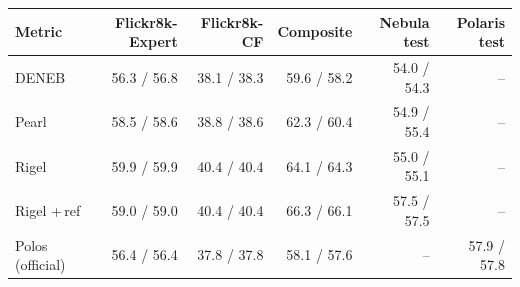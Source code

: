 \begin{tabular}{lrrrrr}
\toprule
Metric & Flickr8k-Expert & Flickr8k-CF & Composite & Nebula test & Polaris test \\
\midrule
DENEB & 56.3 / 56.8 & 38.1 / 38.3 & 59.6 / 58.2 & 54.0 / 54.3 & -- \\
Pearl & 58.5 / 58.6 & 38.8 / 38.6 & 62.3 / 60.4 & 54.9 / 55.4 & -- \\
Rigel & 59.9 / 59.9 & 40.4 / 40.4 & 64.1 / 64.3 & 55.0 / 55.1 & -- \\
Rigel +\,ref & 59.0 / 59.0 & 40.4 / 40.4 & 66.3 / 66.1 & 57.5 / 57.5 & -- \\
Polos (official) & 56.4 / 56.4 & 37.8 / 37.8 & 58.1 / 57.6 & -- & 57.9 / 57.8 \\
\bottomrule
\end{tabular}
